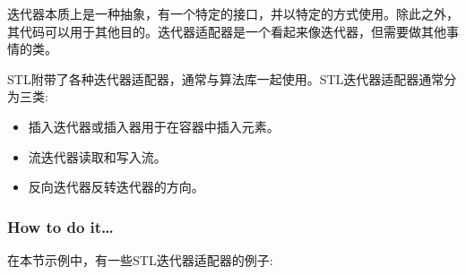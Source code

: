 
迭代器本质上是一种抽象，有一个特定的接口，并以特定的方式使用。除此之外，其代码可以用于其他目的。迭代器适配器是一个看起来像迭代器，但需要做其他事情的类。

STL附带了各种迭代器适配器，通常与算法库一起使用。STL迭代器适配器通常分为三类:

\begin{itemize}
\item 
插入迭代器或插入器用于在容器中插入元素。

\item 
流迭代器读取和写入流。

\item 
反向迭代器反转迭代器的方向。
\end{itemize}

\subsubsection{How to do it…}

在本节示例中，有一些STL迭代器适配器的例子:

